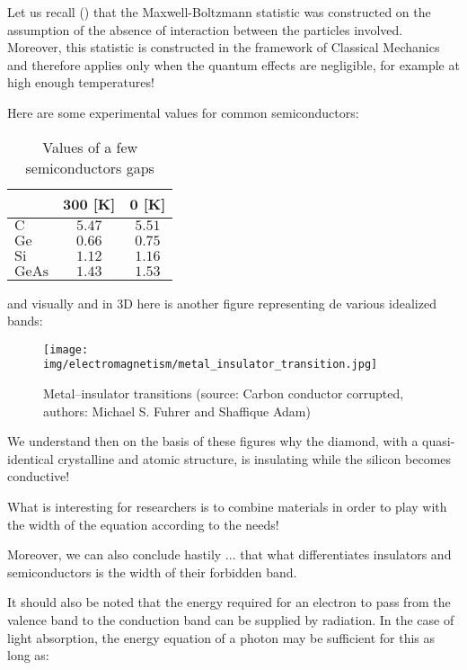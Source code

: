 	\begin{tcolorbox}[title=Remark,colframe=black,arc=10pt]
	Let us recall () that the Maxwell-Boltzmann statistic was constructed on the assumption of the absence of interaction between the particles involved. Moreover, this statistic is constructed in the framework of Classical Mechanics and therefore applies only when the quantum effects are negligible, for example at high enough temperatures!
	\end{tcolorbox}
	Here are some experimental values for common semiconductors:
	\begin{table}[H]
		\centering
		\begin{tabular}{|l|c|c|}
		\hline
		\rowcolor[HTML]{9B9B9B} 
		\multicolumn{1}{|c|}{\cellcolor[HTML]{9B9B9B}\textbf{$\pmb{E_g}$ {[}eV{]}}} & \textbf{$\pmb{300}$ {[}K{]}} & \textbf{$\pmb{0}$ {[}K{]}} \\ \hline
		$\mathrm{C}$ & $5.47$ & $5.51$ \\ \hline
		$\mathrm{Ge}$ & $0.66$ & $0.75$ \\ \hline
		$\mathrm{Si}$ & $1.12$ & $1.16$ \\ \hline
		$\mathrm{GeAs}$ & $1.43$ & $1.53$ \\ \hline
		\end{tabular}
		\caption{Values of a few semiconductors gaps}
	\end{table}
	and visually and in 3D here is another figure representing de various idealized bands:
	\begin{figure}[H]
		\centering
		\texttt{[image: img/electromagnetism/metal\_insulator\_transition.jpg]}
		\caption[Metal–insulator transitions]{Metal–insulator transitions (source: Carbon conductor corrupted, authors: Michael S. Fuhrer and Shaffique Adam)}
	\end{figure}
	We understand then on the basis of these figures why the diamond, with a quasi-identical crystalline and atomic structure, is insulating while the silicon becomes conductive!

	What is interesting for researchers is to combine materials in order to play with the width of the equation according to the needs!

	Moreover, we can also conclude hastily ... that what differentiates insulators and semiconductors is the width of their forbidden band.

	It should also be noted that the energy required for an electron to pass from the valence band to the conduction band can be supplied by radiation. In the case of light absorption, the energy equation of a photon may be sufficient for this as long as:
	
